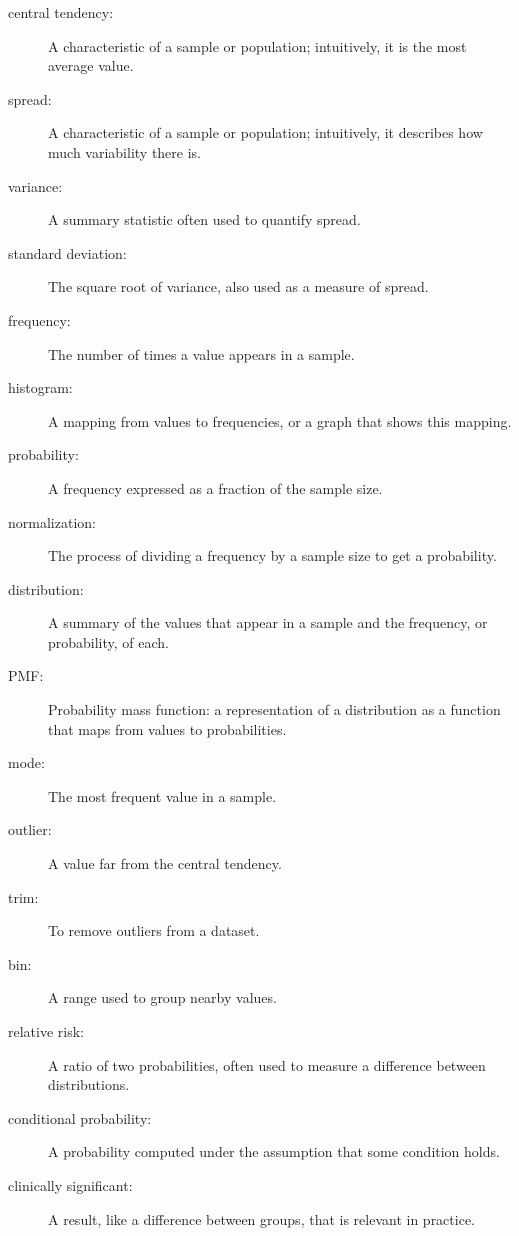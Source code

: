 \documentclass[12pt]{book}
\begin{document}
\begin{description}

\item[central tendency:] A characteristic of a sample or population;
intuitively, it is the most average value. 

\item[spread:] A characteristic of a sample or population;
intuitively, it describes how much variability there is.

\item[variance:] A summary statistic often used to quantify spread.

\item[standard deviation:] The square root of variance, also used
as a measure of spread.

\item[frequency:] The number of times a value appears in a sample.

\item[histogram:] A mapping from values to frequencies, or a graph
that shows this mapping.

\item[probability:] A frequency expressed as a fraction of the sample
size.

\item[normalization:] The process of dividing a frequency by a sample
size to get a probability.

\item[distribution:] A summary of the values that appear in a sample
and the frequency, or probability, of each.

\item[PMF:] Probability mass function: a representation of a distribution
as a function that maps from values to probabilities.

\item[mode:] The most frequent value in a sample.

\item[outlier:] A value far from the central tendency.

\item[trim:] To remove outliers from a dataset.

\item[bin:] A range used to group nearby values.

\item[relative risk:] A ratio of two probabilities, often used to measure
a difference between distributions.

\item[conditional probability:] A probability computed under the assumption
that some condition holds.

\item[clinically significant:] A result, like a difference between groups,
that is relevant in practice.

\end{description}
\end{document}
